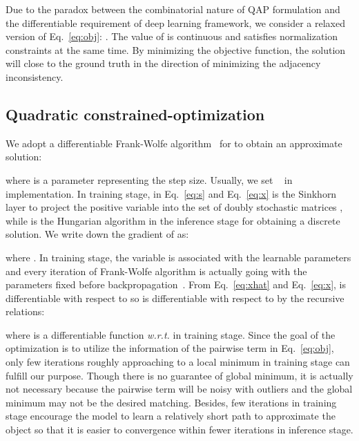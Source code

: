 \documentclass[final]{cvpr}
\begin{document}
Due to the paradox between the combinatorial nature of QAP formulation and the differentiable requirement of deep learning framework, we consider a relaxed version of Eq.~\eqref{eq:obj}: . The value of  is continuous and satisfies normalization constraints at the same time. By minimizing the objective function, the solution will close to the ground truth in the direction of minimizing the adjacency inconsistency.

\subsection{Quadratic constrained-optimization}
We adopt a differentiable Frank-Wolfe algorithm~\cite{lacoste2015global} for  to obtain an approximate solution:

where  is a parameter representing the step size. Usually, we set ~\cite{jaggi2013revisiting} in implementation. In training stage,  in Eq.~\eqref{eq:s} and Eq.~\eqref{eq:x} is the Sinkhorn layer to project the positive variable into the set of doubly stochastic matrices , while  is the Hungarian algorithm in the inference stage for obtaining a discrete solution. We write down the gradient of  as:

where . In training stage, the variable  is associated with the learnable parameters  and every iteration of Frank-Wolfe algorithm is actually going with the parameters fixed before backpropagation~\cite{ionescu2015training}. From Eq.~\eqref{eq:xhat} and Eq.~\eqref{eq:x},  is differentiable with respect to  so  is differentiable with respect to  by the recursive relations:

where  is a differentiable function {\em w.r.t.}  in training stage.
Since the goal of the optimization is to utilize the information of the pairwise term in Eq.~\eqref{eq:obj}, only few iterations roughly approaching to a local minimum in training stage can fulfill our purpose. Though there is no guarantee of global minimum, it is actually not necessary because the pairwise term will be noisy with outliers and the global minimum may not be the desired matching. Besides, few iterations in training stage encourage the model to learn a relatively short path to approximate the object so that it is easier to convergence within fewer iterations in inference stage.
\end{document}
